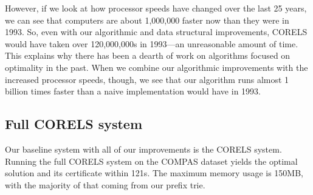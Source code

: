 However, if we look at how processor speeds have changed over the last 25 years, we can see that computers are about 1,000,000 faster now than they were in 1993. \cite{Supercomputer}
So, even with our algorithmic and data structural improvements, CORELS would have taken over 120,000,000s in 1993---an unreasonable amount of time.
This explains why there has been a dearth of work on algorithms focused on optimality in the past.
When we combine our algorithmic improvements with the increased processor speeds, though, we see that our algorithm runs almost 1 billion times faster than a naive implementation would have in 1993.

\subsection{Full CORELS system}

Our baseline system with all of our improvements is the CORELS system.
Running the full CORELS system on the COMPAS dataset yields the optimal solution and its certificate within 121s.
The maximum memory usage is 150MB, with the majority of that coming from our prefix trie.

